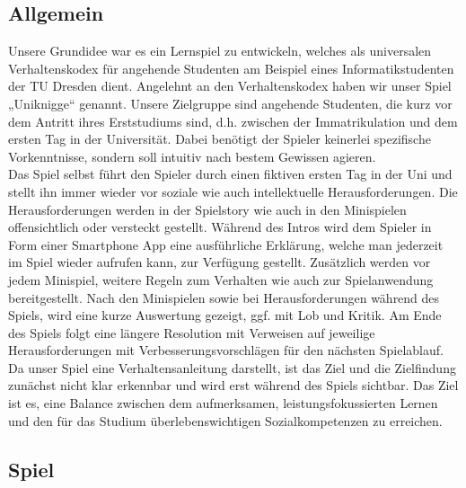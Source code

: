 \documentclass[a4paper, 11pt]{article} %
\begin{document}
\subsection{Allgemein}
Unsere Grundidee war es ein Lernspiel zu entwickeln, welches als universalen Verhaltenskodex für angehende Studenten am Beispiel eines Informatikstudenten der TU Dresden dient. Angelehnt an den Verhaltenskodex haben wir unser Spiel „Uniknigge“ genannt. Unsere Zielgruppe sind angehende Studenten, die kurz vor dem Antritt ihres Erststudiums sind, d.h. zwischen der Immatrikulation und dem ersten Tag in der Universität. Dabei benötigt der Spieler keinerlei spezifische Vorkenntnisse, sondern soll intuitiv nach bestem Gewissen agieren. \\

Das Spiel selbst führt den Spieler durch einen fiktiven ersten Tag in der Uni und stellt ihn immer wieder vor soziale wie auch intellektuelle Herausforderungen. Die Herausforderungen werden in der Spielstory wie auch in den Minispielen offensichtlich oder versteckt gestellt. Während des Intros wird dem Spieler in Form einer Smartphone App eine ausführliche Erklärung, welche man jederzeit im Spiel wieder aufrufen kann, zur Verfügung gestellt. Zusätzlich werden vor jedem Minispiel, weitere Regeln zum Verhalten wie auch zur Spielanwendung bereitgestellt. Nach den Minispielen sowie bei Herausforderungen während des Spiels, wird eine kurze Auswertung gezeigt, ggf. mit Lob und Kritik. Am Ende des Spiels folgt eine längere Resolution mit Verweisen auf jeweilige Herausforderungen mit Verbesserungsvorschlägen für den nächsten Spielablauf. Da unser Spiel eine Verhaltensanleitung darstellt, ist das Ziel und die Zielfindung zunächst nicht klar erkennbar und wird erst während des Spiels sichtbar.
Das Ziel ist es, eine Balance zwischen dem aufmerksamen, leistungsfokussierten Lernen und den für das Studium überlebenswichtigen Sozialkompetenzen zu erreichen.

\subsection{Spiel}
\end{document}
